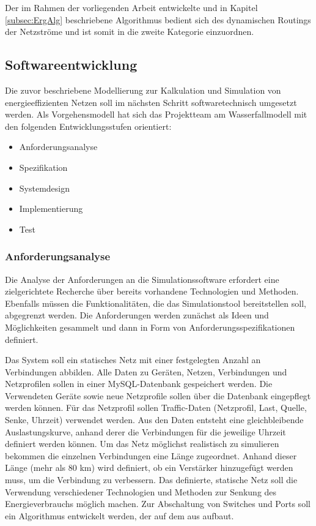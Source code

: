 Der im Rahmen der vorliegenden Arbeit entwickelte und in Kapitel \ref{subsec:ErgAlg} beschriebene Algorithmus bedient sich des dynamischen Routings der Netzströme und ist somit in die zweite Kategorie einzuordnen.

\subsection{Softwareentwicklung}\label{subsec:VorgSoftwareEng}
Die zuvor beschriebene Modellierung zur Kalkulation und Simulation von energieeffizienten Netzen soll im nächsten Schritt softwaretechnisch umgesetzt werden. Als Vorgehensmodell hat sich das Projektteam am Wasserfallmodell mit den folgenden Entwicklungsstufen orientiert:
\begin{itemize}
\item Anforderungsanalyse
\item Spezifikation
\item Systemdesign
\item Implementierung
\item Test
\end{itemize}

\subsubsection{Anforderungsanalyse}
Die Analyse der Anforderungen an die Simulationssoftware erfordert eine zielgerichtete Recherche über bereits vorhandene Technologien und Methoden. Ebenfalls müssen die Funktionalitäten, die das Simulationstool bereitstellen soll, abgegrenzt werden. Die Anforderungen werden zunächst als Ideen und Möglichkeiten gesammelt und dann in Form von Anforderungsspezifikationen definiert. 

Das System soll ein statisches Netz mit einer festgelegten Anzahl an Verbindungen abbilden. Alle Daten zu Geräten, Netzen, Verbindungen und Netzprofilen sollen in einer MySQL-Datenbank gespeichert werden. Die Verwendeten Geräte sowie neue Netzprofile sollen über die Datenbank eingepflegt werden können. Für das Netzprofil sollen Traffic-Daten (Netzprofil, Last, Quelle, Senke, Uhrzeit) verwendet werden. Aus den Daten entsteht eine gleichbleibende Auslastungskurve, anhand derer die Verbindungen für die jeweilige Uhrzeit definiert werden können. Um das Netz möglichst realistisch zu simulieren bekommen die einzelnen Verbindungen eine Länge zugeordnet. Anhand dieser Länge (mehr als 80 km) wird definiert, ob ein Verstärker hinzugefügt werden muss, um die Verbindung zu verbessern. Das definierte, statische Netz soll die Verwendung verschiedener Technologien und Methoden zur Senkung des Energieverbrauchs möglich machen. Zur Abschaltung von Switches und Ports soll ein Algorithmus entwickelt werden, der auf dem  aus \cite{fisher} aufbaut.

